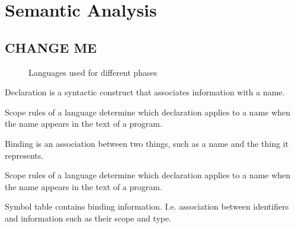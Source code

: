 \section{Semantic Analysis}


\subsection{CHANGE ME}

\begin{figure}[H]
    \centering
    \caption{Languages used for different phases}
    \label{fig:language-in-different-phases}
\end{figure}


\begin{definition}[Declaration]
    Declaration is a syntactic construct that associates information with a name.
\end{definition}


\begin{definition}
    Scope rules of a language determine which declaration applies to a name when the name appears in the text of a program.
\end{definition}


\begin{definition}[Binding]
    Binding is an association between two things, such as a name and the thing it represents.
\end{definition}

\begin{definition}[]
    Scope rules of a language determine which declaration applies to a name when the name appears in the text of a program.
\end{definition}







\begin{definition}
    Symbol table contains binding information. I.e. association between identifiers and information such as their scope and type.
\end{definition}